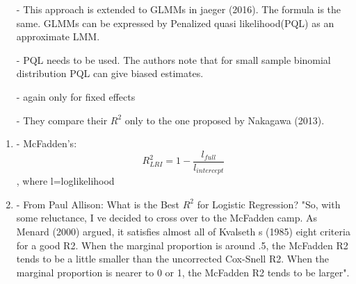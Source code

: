\documentclass[11pt, a4paper]{article}\usepackage[]{graphicx}\usepackage[]{color}
\begin{document}
\begin{enumerate}
\item[-] This approach is extended to GLMMs in jaeger (2016). The formula is the same. GLMMs can be expressed by Penalized quasi likelihood(PQL) as an approximate LMM.

\item[-] PQL needs to be used. The authors note that for small sample binomial distribution PQL can give biased estimates.

\item[-] again only for fixed effects

\item[-] They compare their $R^2$ only to the one proposed by Nakagawa (2013).


\end{enumerate}


\begin {enumerate}

\item[-] McFadden's:\begin{equation} R^2_{LRI} = 1 - \frac{l_{full}}{l_{intercept}} \end{equation}, where l=loglikelihood
\item[-] From Paul Allison: What is the Best $R^2$ for Logistic Regression? "So, with some reluctance, I ve decided to cross over to the McFadden camp. As Menard (2000) argued, it satisfies almost all of Kvalseth s (1985) eight criteria for a good R2. When the marginal proportion is around .5, the McFadden R2 tends to be a little smaller than the uncorrected Cox-Snell R2. When the marginal proportion is nearer to 0 or 1, the McFadden R2 tends to be larger".

\end{enumerate}
\end{document}
